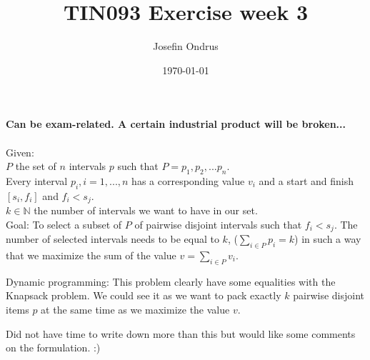 \documentclass[12pt,oneside,reqno]{amsart}
\begin{document}
\setlength{\parindent}{6pt}
\def\code#1{\texttt{#1}} %

\title{TIN093 Exercise week 3}
\author{Josefin Ondrus}
\date{\today}
\maketitle



\textbf{Can be exam-related. A certain industrial product will be broken...}\\\\
Given: \\
$P$ the set of $n$ intervals $p$ such that $P={p_1, p_2,...p_n}$.\\
Every interval $p_i, i=1,...,n$ has a corresponding value $v_i$ and a start and finish $[s_i,f_i]$ and $f_i < s_j$.\\
$k \in \mathbb{N}$ the number of intervals we want to have in our set.\\

Goal: To select a subset of $P$ of pairwise disjoint intervals such that $f_i < s_j$. The number of selected intervals needs to be equal to $k$, ($\sum\limits_{i\in P}p_i=k$) in such a way that we maximize the sum of the value $v = \sum\limits_{i\in P}v_i$.

Dynamic programming: This problem clearly have some equalities with the Knapsack problem. We could see it as we want to pack exactly $k$ pairwise disjoint items $p$ at the same time as we maximize the value $v$.

Did not have time to write down more than this but would like some comments on the formulation. :)
\end{document}
